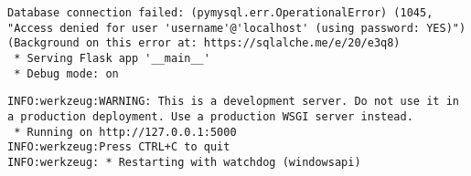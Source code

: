 \documentclass[
  letterpaper,
  DIV=11,
  numbers=noendperiod]{scrreprt}
\begin{document}
\begin{verbatim}
Database connection failed: (pymysql.err.OperationalError) (1045, "Access denied for user 'username'@'localhost' (using password: YES)")
(Background on this error at: https://sqlalche.me/e/20/e3q8)
 * Serving Flask app '__main__'
 * Debug mode: on
\end{verbatim}

\begin{verbatim}
INFO:werkzeug:WARNING: This is a development server. Do not use it in a production deployment. Use a production WSGI server instead.
 * Running on http://127.0.0.1:5000
INFO:werkzeug:Press CTRL+C to quit
INFO:werkzeug: * Restarting with watchdog (windowsapi)
\end{verbatim}

\end{document}
